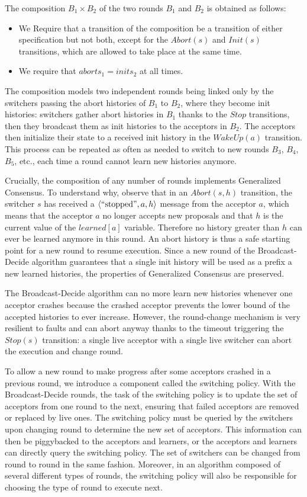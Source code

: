 The composition $B_1\times B_2$ of the two rounds $B_1$ and $B_2$ is obtained as follows:
\begin{itemize}
  \item We Require that a transition of the composition be a transition of either specification but not both, except for the $Abort\left( s \right)$ and $Init\left( s \right)$ transitions, which are allowed to take place at the same time. 
  \item We require that $aborts_1 = inits_2$ at all times.
\end{itemize}
The composition models two independent rounds being linked only by the switchers passing the abort histories of $B_1$ to $B_2$, where they become init histories: switchers gather abort histories in $B_1$ thanks to the $Stop$ transitions, then they broadcast them as init histories to the acceptors in $B_2$. The acceptors then initialize their state to a received init history in the $WakeUp\left( a \right)$ transition.
This process can be repeated as often as needed to switch to new rounds $B_3$, $B_4$, $B_5$, etc., each time a round cannot learn new histories anymore.

Crucially, the composition of any number of rounds implements Generalized Consensus.  To understand why, observe that in an $Abort\left( s,h \right)$ transition, the switcher $s$ has received a $\left\langle\text{``stopped''},a,h\right\rangle$ message from the acceptor $a$, which means that the acceptor $a$ no longer accepts new proposals and that $h$ is the current value of the $learned\left[ a \right]$ variable. Therefore no history greater than $h$ can ever be learned anymore in this round. An abort history is thus a safe
starting point for a new round to resume execution. Since a new round of the Broadcast-Decide algorithm guarantees that a single init history will be used as a prefix a new learned histories, the properties of Generalized Consensus are preserved. 

The Broadcast-Decide algorithm can no more learn new histories whenever one acceptor crashes because the crashed acceptor prevents the lower bound of the accepted histories to ever increase. However, the round-change mechanism is very resilient to faults and can abort anyway thanks to the timeout triggering the $Stop\left( s \right)$ transition: a single live acceptor with a single live switcher can abort the execution and change round.

To allow a new round to make progress after some acceptors crashed in a previous round, we introduce a component called the switching policy. With the Broadcast-Decide rounds, the task of the switching policy is to update the set of acceptors from one round to the next, ensuring that failed acceptors are removed or replaced by live ones. The switching policy must be queried by the switchers upon changing round to determine the new set of acceptors. This information can then be piggybacked to the
acceptors and learners, or the acceptors and learners can directly query the switching policy. 
The set of switchers can be changed from round to round in the same fashion. Moreover, in an algorithm composed of several different types of rounds, the switching policy will also be responsible for choosing the type of round to execute next.

